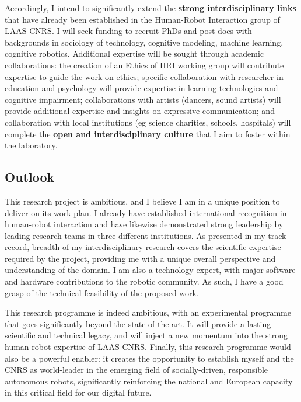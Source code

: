 Accordingly, I intend to significantly extend the \textbf{strong
interdisciplinary links} that have already been established in the Human-Robot
Interaction group of LAAS-CNRS. I will seek funding to recruit PhDs and
post-docs with backgrounds in sociology of technology, cognitive modeling,
machine learning, cognitive robotics. Additional expertise will be sought
through academic collaborations: the creation of an Ethics of HRI working group
will contribute expertise to guide the work on ethics; specific collaboration
with researcher in education and psychology will provide expertise in learning
technologies and cognitive impairment; collaborations with artists (dancers,
sound artists) will provide additional expertise and insights on expressive
communication; and collaboration with local institutions (eg science charities,
schools, hospitals) will complete the \textbf{open and interdisciplinary
culture} that I aim to foster within the laboratory.

\subsection{Outlook}

This research project is ambitious, and I believe I am in a unique position to
deliver on its work plan. I already have established international recognition in
human-robot interaction and have likewise demonstrated strong leadership by
leading research teams in three different institutions. As presented in my
track-record, breadth of my interdisciplinary research covers the scientific expertise
required by the project, providing me with a unique overall perspective and
understanding of the domain. I am also a technology expert, with major software
and hardware contributions to the robotic community. As such,
I have a good grasp of the technical feasibility of the proposed work.

This research programme is indeed ambitious, with an experimental programme that
goes significantly beyond the state of the art. It will provide a lasting
scientific and technical legacy, and will inject a new momentum into the strong
human-robot expertise of LAAS-CNRS. Finally, this research programme would also
be a powerful enabler: it creates the opportunity to establish myself and the
CNRS as world-leader in the emerging field of socially-driven, responsible
autonomous robots, significantly reinforcing the national and European capacity
in this critical field for our digital future.

